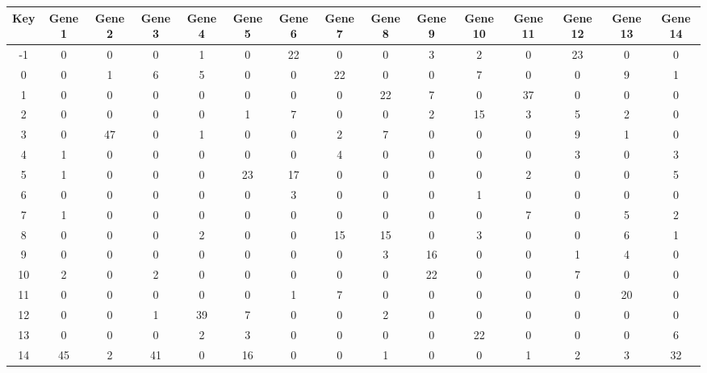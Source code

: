 \begin{tabular}{|c|c|c|c|c|c|c|c|c|c|c|c|c|c|c|}
\hline
Key & Gene 1 & Gene 2 & Gene 3 & Gene 4 & Gene 5 & Gene 6 & Gene 7 & Gene 8 & Gene 9 & Gene 10 & Gene 11 & Gene 12 & Gene 13 & Gene 14 \\
\hline
-1 & 0 & 0 & 0 & 1 & 0 & 22 & 0 & 0 & 3 & 2 & 0 & 23 & 0 & 0 \\
0 & 0 & 1 & 6 & 5 & 0 & 0 & 22 & 0 & 0 & 7 & 0 & 0 & 9 & 1 \\
1 & 0 & 0 & 0 & 0 & 0 & 0 & 0 & 22 & 7 & 0 & 37 & 0 & 0 & 0 \\
2 & 0 & 0 & 0 & 0 & 1 & 7 & 0 & 0 & 2 & 15 & 3 & 5 & 2 & 0 \\
3 & 0 & 47 & 0 & 1 & 0 & 0 & 2 & 7 & 0 & 0 & 0 & 9 & 1 & 0 \\
4 & 1 & 0 & 0 & 0 & 0 & 0 & 4 & 0 & 0 & 0 & 0 & 3 & 0 & 3 \\
5 & 1 & 0 & 0 & 0 & 23 & 17 & 0 & 0 & 0 & 0 & 2 & 0 & 0 & 5 \\
6 & 0 & 0 & 0 & 0 & 0 & 3 & 0 & 0 & 0 & 1 & 0 & 0 & 0 & 0 \\
7 & 1 & 0 & 0 & 0 & 0 & 0 & 0 & 0 & 0 & 0 & 7 & 0 & 5 & 2 \\
8 & 0 & 0 & 0 & 2 & 0 & 0 & 15 & 15 & 0 & 3 & 0 & 0 & 6 & 1 \\
9 & 0 & 0 & 0 & 0 & 0 & 0 & 0 & 3 & 16 & 0 & 0 & 1 & 4 & 0 \\
10 & 2 & 0 & 2 & 0 & 0 & 0 & 0 & 0 & 22 & 0 & 0 & 7 & 0 & 0 \\
11 & 0 & 0 & 0 & 0 & 0 & 1 & 7 & 0 & 0 & 0 & 0 & 0 & 20 & 0 \\
12 & 0 & 0 & 1 & 39 & 7 & 0 & 0 & 2 & 0 & 0 & 0 & 0 & 0 & 0 \\
13 & 0 & 0 & 0 & 2 & 3 & 0 & 0 & 0 & 0 & 22 & 0 & 0 & 0 & 6 \\
14 & 45 & 2 & 41 & 0 & 16 & 0 & 0 & 1 & 0 & 0 & 1 & 2 & 3 & 32 \\
\hline
\end{tabular}